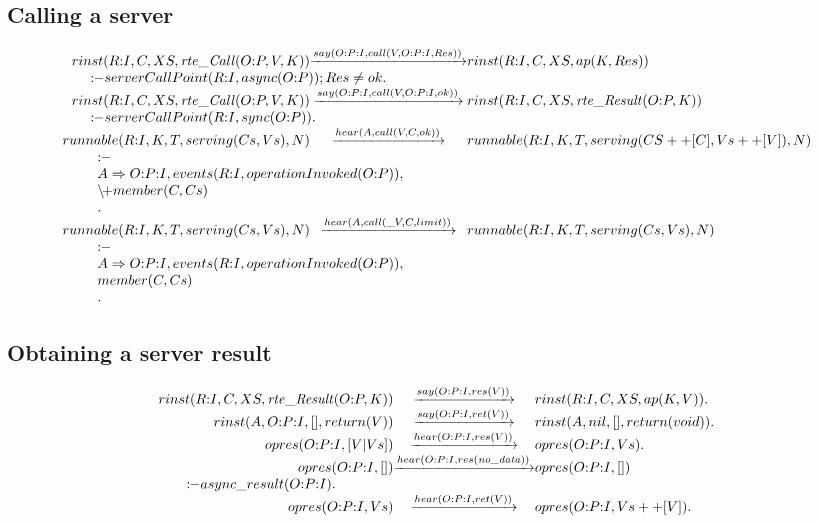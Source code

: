 \subsection{Calling a server}

\newcommand{\Pcontline}[1]{\\\multicolumn{3}{l}{\qquad #1}}
\newcommand{\Pbackslashplus}{\mathbin{\backslash\!{+}}}
\[
\begin{array}{r@{}c@{}l}
  \Preduce{rinst(R{:}I, C, XS, \rte{Call}(O{:}P,V,K))}{say(O{:}P{:}I,call(V,O{:}P{:}I,Res))}{rinst(R{:}I, C, XS, ap(K,Res))}
  \Pcontline{\Pif serverCallPoint(R{:}I, async(O{:}P)) ; Res \neq ok   .}
\\\Preduce{rinst(R{:}I, C, XS, \rte{Call}(O{:}P,V,K))}{say(O{:}P{:}I,call(V,O{:}P{:}I,ok))}{rinst(R{:}I, C, XS, \rte{Result}(O{:}P,K))}
  \Pcontline{\Pif serverCallPoint(R{:}I, sync(O{:}P))  .}
\\\Preduce{runnable(R{:}I, K, T, serving(Cs,Vs), N)}{hear(A,call(V,C,ok))}{runnable(R{:}I, K, T, serving(CS++[C],Vs++[V]), N)}
  \Pcontline{\begin{array}{l}
               \Pif
             \\A\Rightarrow{}O{:}P{:}I, events(R{:}I, operationInvoked(O{:}P)),
             \\\Pbackslashplus member(C, Cs)
             \\.
             \end{array}}
\\\Preduce{runnable(R{:}I, K, T, serving(Cs,Vs), N)}{hear(A,call(\_V,C,limit))}{runnable(R{:}I, K, T, serving(Cs,Vs), N)}
  \Pcontline{\begin{array}{l}
               \Pif
             \\A\Rightarrow{}O{:}P{:}I, events(R{:}I, operationInvoked(O{:}P)),
             \\member(C, Cs)
             \\.
             \end{array}}
\end{array}
\]


\subsection{Obtaining a server result}

\[
\begin{array}{r@{}c@{}l}
  \Preduce{rinst(R{:}I, C, XS, \rte{Result}(O{:}P,K))}{say(O{:}P{:}I,res(V))}         {rinst(R{:}I, C, XS, ap(K,V))}  .
\\\Preduce{rinst(A, O{:}P{:}I, [], return(V))        }{say(O{:}P{:}I,ret(V))}         {rinst(A, nil, [], return(void))}.
\\\Preduce{opres(O{:}P{:}I, [V|Vs])                  }{hear(O{:}P{:}I,res(V))}        {opres(O{:}P{:}I, Vs)}               .
\\\Preduce{opres(O{:}P{:}I, [])                      }{hear(O{:}P{:}I,res(\nodata))}  {opres(O{:}P{:}I, [])}
  \Pcontline{\Pif    async\_result(O{:}P{:}I)   .}
\\\Preduce{opres(O{:}P{:}I, Vs)                      }{hear(O{:}P{:}I,ret(V))}        {opres(O{:}P{:}I, Vs++[V])} .
\end{array}
\]


